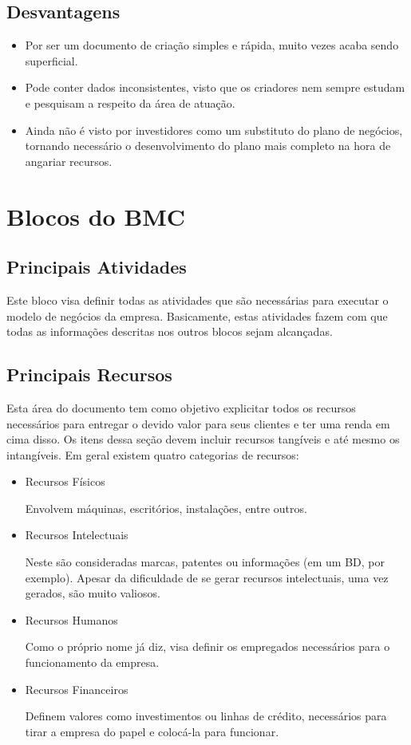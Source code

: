 \subsection{Desvantagens}

\begin{itemize}
\item Por ser um documento de criação simples e rápida, muito vezes acaba sendo superficial.
\item Pode conter dados inconsistentes, visto que os criadores nem sempre estudam e pesquisam a respeito da área de atuação.
\item Ainda não é visto por investidores como um substituto do plano de negócios, tornando necessário o desenvolvimento do plano mais completo na hora de angariar recursos.
\end{itemize}

\section{Blocos do BMC}

\subsection{Principais Atividades}

Este bloco visa definir todas as atividades que são necessárias para executar o modelo de negócios da empresa. Basicamente, estas atividades fazem com que todas as informações descritas nos outros blocos sejam alcançadas.

\subsection{Principais Recursos}

Esta área do documento tem como objetivo explicitar todos os recursos necessários para entregar o devido valor para seus clientes e ter uma renda em cima disso. Os itens dessa seção devem incluir recursos tangíveis e até mesmo os intangíveis. Em geral existem quatro categorias de recursos:

\begin{itemize}
\item Recursos Físicos

Envolvem máquinas, escritórios, instalações, entre outros.

\item Recursos Intelectuais

Neste são consideradas marcas, patentes ou informações (em um BD, por exemplo). Apesar da dificuldade de se gerar recursos intelectuais, uma vez gerados, são muito valiosos.

\item Recursos Humanos

Como o próprio nome já diz, visa definir os empregados necessários para o funcionamento da empresa.

\item Recursos Financeiros

Definem valores como investimentos ou linhas de crédito, necessários para tirar a empresa do papel e colocá-la para funcionar.
\end{itemize} 

